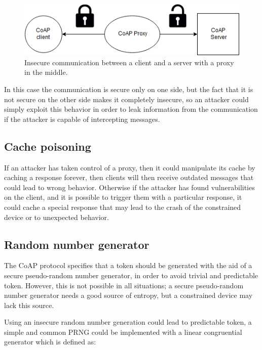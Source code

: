	\begin{figure}
		\includegraphics[width=\linewidth]{coap-vuln-img4.png}
		\caption{Insecure communication between a client and a server with a proxy in the middle.}
		\label{fig:coap-vuln4}
	\end{figure}
	
	In this case the communication is secure only on one side, but the fact that it is not secure on the other side makes it completely insecure, so an attacker could simply exploit this behavior in order to leak information from the communication if the attacker is capable of intercepting messages.\newline
	
	\subsection{Cache poisoning}
	If an attacker has taken control of a proxy, then it could manipulate its cache by caching a response forever, then clients will then receive outdated messages that could lead to wrong behavior.\newline
	Otherwise if the attacker has found vulnerabilities on the client, and it is possible to trigger them with a particular response, it could cache a special response that may lead to the crash of the constrained device or to unexpected behavior.
	
	\subsection{Random number generator}
	The CoAP protocol specifies that a token should be generated with the aid of a secure pseudo-random number generator, in order to avoid trivial and predictable token.\newline
	However, this is not possible in all situations; a secure pseudo-random number generator needs a good source of entropy, but a constrained device may lack this source.\newline
	
	Using an insecure random number generation could lead to predictable token, a simple and common PRNG could be implemented with a linear congruential generator which is defined as:
	

